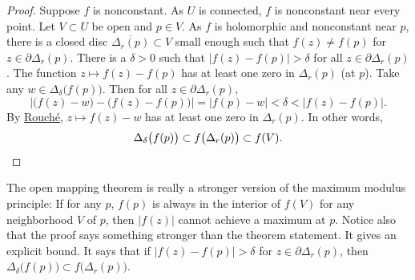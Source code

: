 \documentclass[12pt,openany]{book}
\newcommand{\sabs}[1]{\lvert {#1} \rvert}
\newcommand{\abs}[1]{\left\lvert {#1} \right\rvert}
\theoremstyle{plain}
\theoremstyle{remark}
\theoremstyle{definition}
\theoremstyle{exercise}
\theoremstyle{example}
\begin{document}
\begin{proof}
Suppose $f$ is nonconstant.  As $U$ is connected, $f$ is nonconstant
near every point.
Let $V \subset U$ be open and $p \in V$.
As $f$
is holomorphic and nonconstant near $p$,  
there is a closed disc $\overline{\Delta_r(p)} \subset V$ small enough such that
$f(z) \not= f(p)$ for $z \in \partial \Delta_r(p)$.
There is a $\delta > 0$ such
that $\abs{f(z)-f(p)} > \delta$ for all $z \in \partial \Delta_r(p)$.
The function $z \mapsto f(z)-f(p)$ has at least one zero in $\Delta_r(p)$
(at $p$).  Take any $w \in \Delta_{\delta}\bigl(f(p)\bigr)$.  Then for
all $z \in \partial \Delta_r(p)$,
\begin{equation*}
\abs{\bigl( f(z)-w \bigr) - \bigl( f(z)-f(p) \bigr)} = \abs{f(p)-w} <
\delta < \abs{f(z)-f(p)} .
\end{equation*}
By \hyperref[thm:rouche2]{Rouch\'e}, $z \mapsto f(z)-w$ has at least one
zero in $\Delta_r(p)$.
In other words,
\begin{equation*}
\Delta_{\delta}\bigl(f(p)\bigr) \subset
f\bigl(\Delta_r(p)\bigr) \subset f(V) .  \qedhere
\end{equation*}
\end{proof}

The open mapping theorem is really a stronger version of
the maximum modulus principle:
If for any $p$,
$f(p)$ is always in the interior of $f(V)$ for any neighborhood $V$ of
$p$, then $\sabs{f(z)}$ cannot achieve a maximum at $p$.
Notice also that the proof says something stronger than the theorem statement.  It
gives an explicit bound.  It says that if 
$\abs{f(z)-f(p)} > \delta$ for $z \in \partial \Delta_r(p)$,
then
$\Delta_{\delta}\bigl(f(p)\bigr) \subset f\bigl(\Delta_r(p)\bigr)$.
\end{document}
